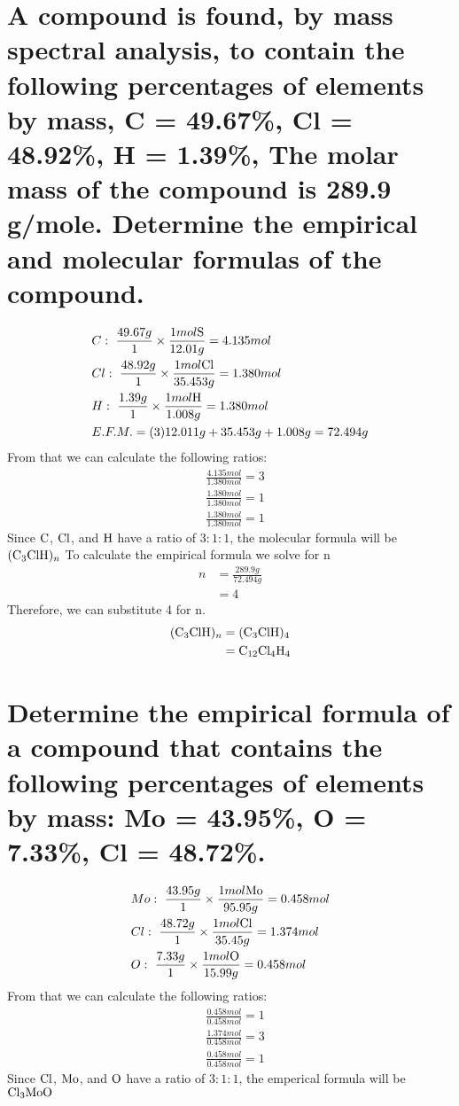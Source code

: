 \documentclass[11pt]{article}
\begin{document}
\section{A compound is found, by mass spectral analysis, to contain the following percentages of elements by mass, C = 49.67\%, Cl = 48.92\%, H = 1.39\%, The molar mass of the compound is 289.9 g/mole. Determine the empirical and molecular formulas of the compound.}
\label{sec:orge555358}
\begin{align*}
&C:\ \frac{49.67g}{1}\times\frac{1mol\ce{S}}{12.01g}=4.135mol\\
&Cl:\ \frac{48.92g}{1}\times\frac{1mol\ce{Cl}}{35.453g}=1.380mol\\
&H:\ \frac{1.39g}{1}\times\frac{1mol\ce{H}}{1.008g}=1.380mol\\
&E.F.M.=(3)12.011g+35.453g+1.008g=72.494g
\end{align*}
From that we can calculate the following ratios:
\begin{align*}
&\frac{4.135mol}{1.380mol}=3\\
&\frac{1.380mol}{1.380mol}=1\\
&\frac{1.380mol}{1.380mol}=1
\end{align*}
Since \(\ce{C}\), \(\ce{Cl}\), and  \(\ce{H}\) have a ratio of \(3:1:1\), the molecular formula will be \(\ce{(C3ClH)_n}\) To calculate the empirical formula we solve for n
\begin{align*}
n&=\frac{289.9g}{72.494g}\\
&=4
\end{align*}
Therefore, we can substitute 4 for n.
\begin{align*}
\ce{(C3ClH)_n}&=\ce{(C3ClH)4}\\
&=\ce{C12Cl4H4}
\end{align*}

\section{Determine the empirical formula of a compound that contains the following percentages of elements by mass: Mo = 43.95\%, O = 7.33\%, Cl = 48.72\%.}
\label{sec:orged83f3c}
\begin{align*}
&Mo:\ \frac{43.95g}{1}\times\frac{1mol\ce{Mo}}{95.95g}=0.458mol\\
&Cl:\ \frac{48.72g}{1}\times\frac{1mol\ce{Cl}}{35.45g}=1.374mol\\
&O:\ \frac{7.33g}{1}\times\frac{1mol\ce{O}}{15.99g}=0.458mol
\end{align*}
From that we can calculate the following ratios:
\begin{align*}
&\frac{0.458mol}{0.458mol}=1\\
&\frac{1.374mol}{0.458mol}=3\\
&\frac{0.458mol}{0.458mol}=1
\end{align*}
 Since \(\ce{Cl}\), \(\ce{Mo}\), and  \(\ce{O}\) have a ratio of \(3:1:1\), the
emperical formula will be  \(\ce{Cl3MoO}\)
\end{document}
